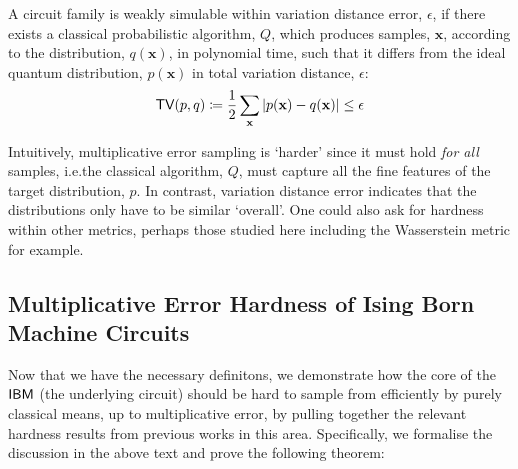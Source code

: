 \begin{definition}
    \label{defnvardiserror}
    A circuit family is weakly simulable within variation distance  error, $\epsilon$, if there exists a classical probabilistic algorithm, $Q$, which produces samples, $\mathbf{x}$, according to the distribution, $q(\mathbf{x})$, in polynomial time, such that it differs from the ideal quantum distribution, $p(\mathbf{x})$ in total variation distance, $\epsilon$:
    \begin{align}
       \operatorname{\textsf{TV}}(p, q)  \coloneqq \frac{1}{2}\sum\limits_{\mathbf{x}}|p(\mathbf{x})- q(\mathbf{x})| \leq \epsilon \label{variationdistanceerror} 
    \end{align}
\end{definition}
Intuitively, multiplicative error sampling is `harder' since it must hold \textit{for all} samples, i.e.\@ the classical algorithm, $Q$, must capture all the fine features of the target distribution, $p$. In contrast, variation distance error indicates that the distributions only have to be similar `overall'. One could also ask for hardness within other metrics, perhaps those studied here including the Wasserstein metric for example.







\subsection{Multiplicative Error Hardness of Ising Born Machine Circuits}

Now that we have the necessary definitons, we demonstrate how the core of the $\textsf{IBM}$ (the underlying circuit) should be hard to sample from efficiently by purely classical means, up to multiplicative error, by pulling together the relevant hardness results from previous works in this area. Specifically, we formalise the discussion in the above text and prove the following theorem:

